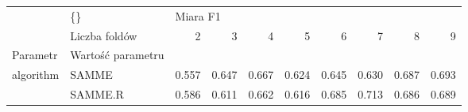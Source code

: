 \begin{tabular}{llrrrrrrrr}
\hline
          & \{\} & \multicolumn{8}{l}{Miara F1} \\
          & Liczba foldów &        2 &      3 &      4 &      5 &      6 &      7 &      8 &      9 \\
Parametr & Wartość parametru &          &        &        &        &        &        &        &        \\
\hline
algorithm & SAMME &    0.557 &  0.647 &  0.667 &  0.624 &  0.645 &  0.630 &  0.687 &  0.693 \\
          & SAMME.R &    0.586 &  0.611 &  0.662 &  0.616 &  0.685 &  0.713 &  0.686 &  0.689 \\
\hline
\end{tabular}
